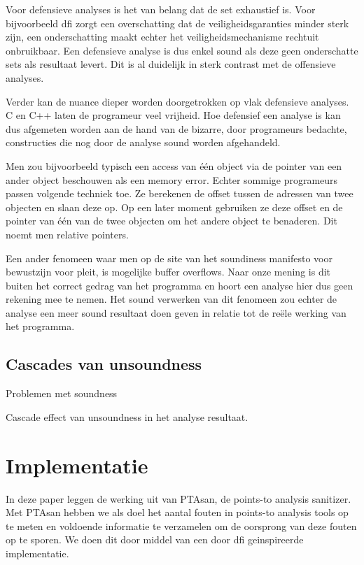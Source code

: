 \documentclass[conference]{IEEEtran}
\begin{document}
Voor defensieve analyses is het van belang dat de set exhaustief is. Voor bijvoorbeeld \gls{dfi} zorgt een overschatting dat de veiligheidsgaranties minder sterk zijn, een onderschatting maakt echter het veiligheidsmechanisme rechtuit onbruikbaar. Een defensieve analyse is dus enkel sound als deze geen onderschatte sets als resultaat levert. Dit is al duidelijk in sterk contrast met de offensieve analyses. 

Verder kan de nuance dieper worden doorgetrokken op vlak defensieve analyses. C en C++ laten de programeur veel vrijheid. Hoe defensief een analyse is kan dus afgemeten worden aan de hand van de bizarre, door programeurs bedachte, constructies die nog door de analyse sound worden afgehandeld. 

Men zou bijvoorbeeld typisch een access van één object via de pointer van een ander object beschouwen als een memory error. Echter sommige programeurs passen volgende techniek toe. Ze berekenen de offset tussen de adressen van twee objecten en slaan deze op. Op een later moment gebruiken ze deze offset en de pointer van één van de twee objecten om het andere object te benaderen. Dit noemt men relative pointers. 

Een ander fenomeen waar men op de site van het soundiness manifesto\cite{noauthor_soundiness_nodate} voor bewustzijn voor pleit, is mogelijke buffer overflows. Naar onze mening is dit buiten het correct gedrag van het programma en hoort een analyse hier dus geen rekening mee te nemen. Het sound verwerken van dit fenomeen zou echter de analyse een meer sound resultaat doen geven in relatie tot de reële werking van het programma. 

\subsection{Cascades van unsoundness}

Problemen met soundness 

Cascade effect van unsoundness in het analyse resultaat. 


\section{Implementatie}
In deze paper leggen de werking uit van PTAsan, de points-to analysis sanitizer. Met PTAsan hebben we als doel het aantal fouten in points-to analysis tools op te meten en voldoende informatie te verzamelen om de oorsprong van deze fouten op te sporen. We doen dit door middel van een door \gls{dfi} geinspireerde implementatie.
\end{document}
